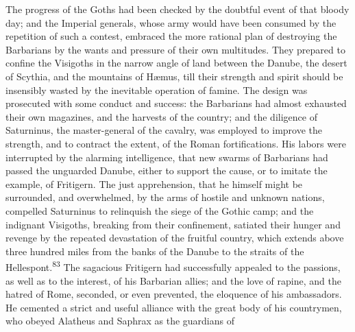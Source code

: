 

The progress of the Goths had been checked by the doubtful event
of that bloody day; and the Imperial generals, whose army would
have been consumed by the repetition of such a contest, embraced
the more rational plan of destroying the Barbarians by the wants
and pressure of their own multitudes. They prepared to confine
the Visigoths in the narrow angle of land between the Danube, the
desert of Scythia, and the mountains of Hæmus, till their
strength and spirit should be insensibly wasted by the inevitable
operation of famine. The design was prosecuted with some conduct
and success: the Barbarians had almost exhausted their own
magazines, and the harvests of the country; and the diligence of
Saturninus, the master-general of the cavalry, was employed to
improve the strength, and to contract the extent, of the Roman
fortifications. His labors were interrupted by the alarming
intelligence, that new swarms of Barbarians had passed the
unguarded Danube, either to support the cause, or to imitate the
example, of Fritigern. The just apprehension, that he himself
might be surrounded, and overwhelmed, by the arms of hostile and
unknown nations, compelled Saturninus to relinquish the siege of
the Gothic camp; and the indignant Visigoths, breaking from their
confinement, satiated their hunger and revenge by the repeated
devastation of the fruitful country, which extends above three
hundred miles from the banks of the Danube to the straits of the
Hellespont.\textsuperscript{83} The sagacious Fritigern had successfully appealed
to the passions, as well as to the interest, of his Barbarian
allies; and the love of rapine, and the hatred of Rome, seconded,
or even prevented, the eloquence of his ambassadors. He cemented
a strict and useful alliance with the great body of his
countrymen, who obeyed Alatheus and Saphrax as the guardians of
